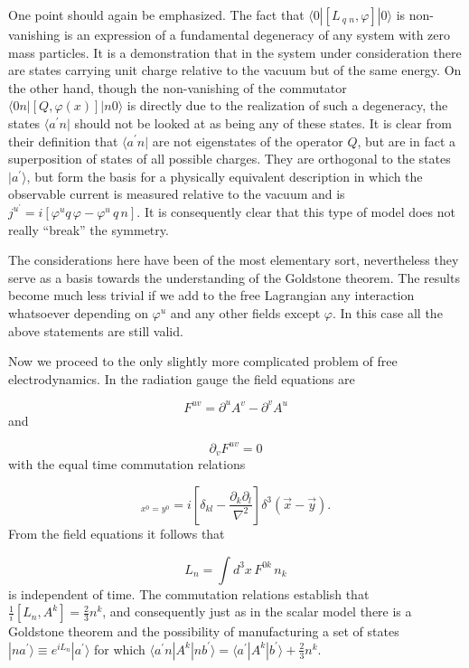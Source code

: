 \documentclass[%
  12pt,
  paper=letter,
  abstracton,
  pagesize=auto,
  version=last,
  DIV=calc
  ]{article}
\begin{document}
One point should again be emphasized.  The fact that $\langle 0 | [L\,_q\,_n,
\varphi] | 0\rangle$ is non-vanishing is an expression of a fundamental
degeneracy of any system with zero mass particles.  It is a
demonstration that in the system under consideration there are states
carrying unit charge relative to the vacuum but of the same energy.
On the other hand, though the non-vanishing of the commutator $\langle
0 n | [Q, \varphi (x)] | n 0\rangle$ is directly due to the realization of such a
degeneracy, the states $\langle a^{\prime} n|$ should not be looked at as being
any of these states.  It is clear from their definition that
$\langle a^{\prime} n |$ are not eigenstates of the operator $Q$, but are in
fact a superposition of states of all possible charges.  They are
orthogonal to the states $|a^{\prime}\rangle$, but form the basis for a
physically equivalent description in which the observable current is
measured relative to the vacuum and is $j^{u^{\prime}} = i[\varphi^u
q\, \varphi - \varphi^u\, q\, n]$.  It is consequently clear that this type
of model does not really ``break'' the symmetry.

The considerations here have been of the most elementary sort,
nevertheless they serve as a basis towards the understanding of the
Goldstone theorem.  The results become much less trivial if we add to
the free Lagrangian any interaction whatsoever depending on
$\varphi^u$ and any other fields except $\varphi$.  In this case all
the above statements are still valid.

Now we proceed to the only slightly more complicated problem of free
electrodynamics.  In the radiation gauge the field equations are

\begin{equation*}
F^{u v} = \partial^u A^v - \partial^v A^u
\end{equation*}
and

\begin{equation*}
\partial_v F^{u v} = 0
\end{equation*}
with the equal time commutation relations

\begin{equation*}
[F^{0 k} (x), A^l (y)]_{x^{0} = y^{0}} = i [ \delta_{k l} - \frac{\partial_k \partial_l}{\nabla^2}] \delta^3 (\vec x - \vec y).
\end{equation*}
From the field equations it follows that

\begin{equation*}
L_n = \int d^3x\, F^{0k}\, n_k
\end{equation*}
is independent of time.  The commutation relations establish that
$\frac{1}{i} [L_n, A^k]=\frac{2}{3} n^k$, and consequently just as in
the scalar model there is a Goldstone theorem and the possibility of
manufacturing a set of states $| n a^{\prime}\rangle \equiv e^{iL_n} |
a^{\prime}\rangle$ for which $\langle a^{\prime} n | A^k | n b^{\prime}\rangle =
\langle a^{\prime} | A^k | b^{\prime}\rangle + \frac{2}{3} n^k$.
\end{document}
